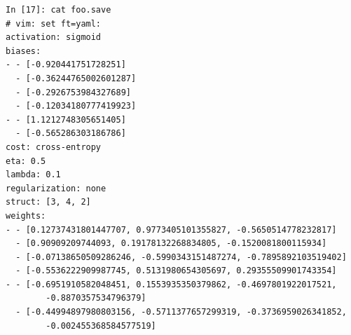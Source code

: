 \documentclass[11pt]{article}
\begin{document}
\begin{lstlisting}
In [17]: cat foo.save                                                                      
# vim: set ft=yaml:                                                                        
activation: sigmoid                                                                        
biases:                                                                                    
- - [-0.920441751728251]                                                                   
  - [-0.36244765002601287]                                                                 
  - [-0.2926753984327689]                                                                  
  - [-0.12034180777419923]                                                                 
- - [1.1212748305651405]                                                                   
  - [-0.565286303186786]                                                                   
cost: cross-entropy                                                                        
eta: 0.5                                                                                   
lambda: 0.1                                                                                
regularization: none                                                                       
struct: [3, 4, 2]                                                                          
weights:                                                                                   
- - [0.12737431801447707, 0.9773405101355827, -0.5650514778232817]                         
  - [0.90909209744093, 0.19178132268834805, -0.1520081800115934]                           
  - [-0.07138650509286246, -0.5990343151487274, -0.7895892103519402]                       
  - [-0.5536222909987745, 0.5131980654305697, 0.29355509901743354]                         
- - [-0.6951910582048451, 0.1553935350379862, -0.4697801922017521, 
		-0.8870357534796379]    
  - [-0.44994897980803156, -0.5711377657299319, -0.3736959026341852,
		-0.002455368584577519]
\end{lstlisting}
\end{document}
